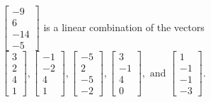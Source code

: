 \begin{exerciseAnswer}
\begin{enumerate}[(a)]
\( \left[\begin{array}{c}
-9 \\
6 \\
-14 \\
-5
\end{array}\right] \) is a linear combination of the vectors \( \left[\begin{array}{c}
3 \\
2 \\
4 \\
1
\end{array}\right] , \left[\begin{array}{c}
-1 \\
-2 \\
4 \\
1
\end{array}\right] , \left[\begin{array}{c}
-5 \\
2 \\
-5 \\
-2
\end{array}\right] , \left[\begin{array}{c}
3 \\
-1 \\
4 \\
0
\end{array}\right] , \text{ and } \left[\begin{array}{c}
1 \\
-1 \\
-1 \\
-3
\end{array}\right] \). 


\end{enumerate}
    
\end{exerciseAnswer}
    
